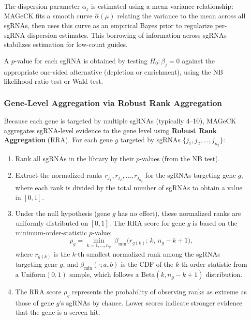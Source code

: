 The dispersion parameter $\alpha_j$ is estimated using a mean-variance relationship: MAGeCK fits a smooth curve $\hat{\alpha}(\mu)$ relating the variance to the mean across all sgRNAs, then uses this curve as an empirical Bayes prior to regularize per-sgRNA dispersion estimates. This borrowing of information across sgRNAs stabilizes estimation for low-count guides.

A $p$-value for each sgRNA is obtained by testing $H_0: \beta_j = 0$ against the appropriate one-sided alternative (depletion or enrichment), using the NB likelihood ratio test or Wald test.

\subsubsection{Gene-Level Aggregation via Robust Rank Aggregation}

Because each gene is targeted by multiple sgRNAs (typically 4--10), MAGeCK aggregates sgRNA-level evidence to the gene level using \textbf{Robust Rank Aggregation} (RRA). For each gene $g$ targeted by sgRNAs $\{j_1, j_2, \ldots, j_{n_g}\}$:

\begin{enumerate}[itemsep=2pt]
  \item Rank all sgRNAs in the library by their $p$-values (from the NB test).
  \item Extract the normalized ranks $r_{j_1}, r_{j_2}, \ldots, r_{j_{n_g}}$ for the sgRNAs targeting gene $g$, where each rank is divided by the total number of sgRNAs to obtain a value in $[0, 1]$.
  \item Under the null hypothesis (gene $g$ has no effect), these normalized ranks are uniformly distributed on $[0,1]$. The RRA score for gene $g$ is based on the minimum-order-statistic $p$-value:
  \begin{equation}
    \rho_g = \min_{k=1,\ldots,n_g} \; \beta_{\text{min}}\bigl(r_{g(k)};\, k,\, n_g - k + 1\bigr),
    \label{eq:specialized:rra}
  \end{equation}
  where $r_{g(k)}$ is the $k$-th smallest normalized rank among the sgRNAs targeting gene $g$, and $\beta_{\text{min}}(\cdot; a, b)$ is the CDF of the $k$-th order statistic from a $\text{Uniform}(0,1)$ sample, which follows a Beta$(k, n_g - k + 1)$ distribution.
  \item The RRA score $\rho_g$ represents the probability of observing ranks as extreme as those of gene $g$'s sgRNAs by chance. Lower scores indicate stronger evidence that the gene is a screen hit.
\end{enumerate}

